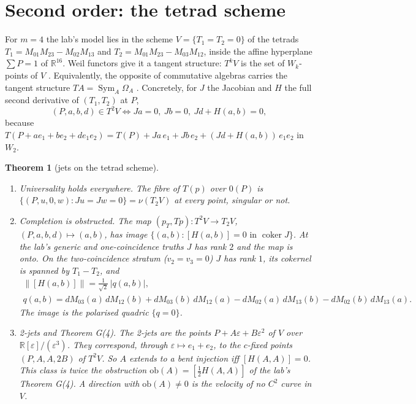\documentclass[11pt]{article}
\newtheorem{theorem}{Theorem}\newtheorem{proposition}[theorem]{Proposition}\newtheorem{lemma}[theorem]{Lemma}\newtheorem{corollary}[theorem]{Corollary}
\theoremstyle{definition}\newtheorem{definition}[theorem]{Definition}\newtheorem{remark}[theorem]{Remark}\newtheorem{example}[theorem]{Example}
\newcommand{\R}{\mathbb R}\newcommand{\X}{\mathbb X}\newcommand{\C}{\mathcal C}
\begin{document}
\section{Second order: the tetrad scheme}\label{sec:scheme}
For $m=4$ the lab's model lies in the scheme $V=\{T_1=T_2=0\}$ of the tetrads $T_1=M_{01}M_{23}-M_{02}M_{13}$ and
$T_2=M_{01}M_{23}-M_{03}M_{12}$, inside the affine hyperplane $\sum P=1$ of $\R^{16}$. Weil functors give it a tangent structure: $T^kV$
is the set of $W_k$-points of $V$ \cite{Weil1953,KolarMichorSlovak1993,Leung2017}. Equivalently, the opposite of commutative algebras
carries the tangent structure $TA=\operatorname{Sym}_A\Omega_A$ \cite{CockettCruttwell2014}. Concretely, for $J$ the Jacobian and $H$ the
full second derivative of $(T_1,T_2)$ at $P$,
\[
(P,a,b,d)\in T^2V\iff Ja=0,\ Jb=0,\ Jd+H(a,b)=0 ,
\]
because $T(P+ae_1+be_2+de_1e_2)=T(P)+Ja\,e_1+Jb\,e_2+(Jd+H(a,b))\,e_1e_2$ in $W_2$.

\begin{theorem}[jets on the tetrad scheme]\label{thm:scheme}
\begin{enumerate}
\item[(1)] \emph{Universality holds everywhere.} The fibre of $T(p)$ over $0(P)$ is $\{(P,u,0,w):Ju=Jw=0\}=\nu(T_2V)$ at every point,
  singular or not.
\item[(2)] \emph{Completion is obstructed.} The map $(p_T,Tp):T^2V\to T_2V$, $(P,a,b,d)\mapsto(a,b)$, has image
  $\{(a,b):[H(a,b)]=0\text{ in }\operatorname{coker}J\}$. At the lab's generic and one-coincidence truths $J$ has rank $2$ and the map
  is onto. On the two-coincidence stratum ($v_2=v_3=0$) $J$ has rank $1$, its cokernel is spanned by $T_1-T_2$, and
\begin{gather*}
\bigl\|[H(a,b)]\bigr\|=\tfrac1{\sqrt2}\,|q(a,b)|,\\
q(a,b)=dM_{03}(a)\,dM_{12}(b)+dM_{03}(b)\,dM_{12}(a)-dM_{02}(a)\,dM_{13}(b)-dM_{02}(b)\,dM_{13}(a).
\end{gather*}
  The image is the polarised quadric $\{q=0\}$.
\item[(3)] \emph{2-jets and Theorem G(4).} The 2-jets are the points $P+A\varepsilon+B\varepsilon^2$ of $V$ over $\R[\varepsilon]/(\varepsilon^3)$. They
  correspond, through $\varepsilon\mapsto e_1+e_2$, to the $c$-fixed points $(P,A,A,2B)$ of $T^2V$. So $A$ extends to a bent injection iff
  $[H(A,A)]=0$. This class is twice the obstruction $\mathrm{ob}(A)=[\tfrac12H(A,A)]$ of the lab's Theorem G(4). A direction with
  $\mathrm{ob}(A)\ne0$ is the velocity of no $C^2$ curve in $V$.
\end{enumerate}
\end{theorem}
\end{document}
